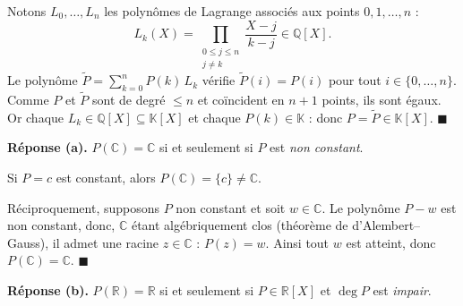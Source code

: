 
\begin{mdframed}[style=proofbar]
  Notons $L_0,\ldots,L_n$ les polynômes de Lagrange associés aux points
  $0,1,\ldots,n$ :
  \[
    L_k(X) = \prod_{\substack{0 \leq j \leq n \\ j \neq k}}
             \frac{X - j}{k - j} \in \mathbb{Q}[X].
  \]
  Le polynôme $\widetilde P = \sum_{k=0}^{n} P(k)\,L_k$ vérifie
  $\widetilde P(i) = P(i)$ pour tout $i \in \{0,\ldots,n\}$. Comme $P$ et
  $\widetilde P$ sont de degré $\leq n$ et coïncident en $n+1$ points, ils sont
  égaux. Or chaque $L_k \in \mathbb{Q}[X] \subseteq \mathbb{K}[X]$ et chaque
  $P(k) \in \mathbb{K}$ : donc $P = \widetilde P \in \mathbb{K}[X]$.
  \hfill$\blacksquare$
\end{mdframed}

\decsep{}


\begin{tcolorbox}[thmbox]
  \textbf{Réponse (a).}\enspace%
  $P(\mathbb{C}) = \mathbb{C}$ si et seulement si $P$ est \emph{non constant}.
\end{tcolorbox}


\begin{mdframed}[style=proofbar]
  Si $P = c$ est constant, alors $P(\mathbb{C}) = \{c\} \neq \mathbb{C}$.

  \smallskip\noindent
  Réciproquement, supposons $P$ non constant et soit $w \in \mathbb{C}$. Le
  polynôme $P - w$ est non constant, donc, $\mathbb{C}$ étant algébriquement
  clos (théorème de d'Alembert--Gauss), il admet une racine $z \in \mathbb{C}$ :
  $P(z) = w$. Ainsi tout $w$ est atteint, donc $P(\mathbb{C}) = \mathbb{C}$.
  \hfill$\blacksquare$
\end{mdframed}

\decsep{}


\begin{tcolorbox}[thmbox]
  \textbf{Réponse (b).}\enspace%
  $P(\mathbb{R}) = \mathbb{R}$ si et seulement si $P \in \mathbb{R}[X]$ et
  $\deg P$ est \emph{impair}.
\end{tcolorbox}

